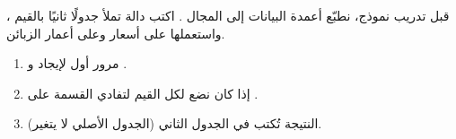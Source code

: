 \begin{statement}
قبل تدريب نموذج، نطبّع أعمدة البيانات إلى المجال \code{[0, 1]}. اكتب دالة  تملأ جدولًا ثانيًا بالقيم ، واستعملها على أسعار وعلى أعمار الزبائن.
\end{statement}
\begin{stepsbox}\begin{enumerate}
\item مرور أول لإيجاد  و .
\item إذا كان  نضع  لكل القيم لتفادي القسمة على .
\item النتيجة تُكتب في الجدول الثاني (الجدول الأصلي لا يتغير).
\end{enumerate}\end{stepsbox}
